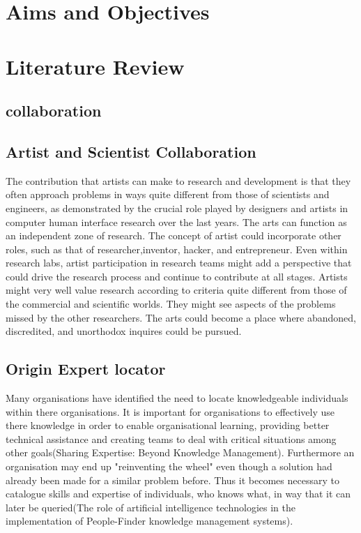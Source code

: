 \documentclass[a4paper,oneside,11pt]{report}
\begin{document}
\tableofcontents


\chapter{Aims and Objectives}
\chapter{Literature Review}
\section{collaboration}
\section{Artist and Scientist Collaboration}
The contribution that artists can make to research and development is that they often
approach problems in ways quite different from those of scientists and engineers, as
demonstrated by the crucial role played by designers and artists in computer human
interface research over the last years. The arts can function as an independent zone of
research. The concept of artist could incorporate other roles, such as that of researcher,inventor, hacker, and entrepreneur. Even within research labs, artist participation in
research teams might add a perspective that could drive the research process and continue
to contribute at all stages. Artists might very well value research according to criteria quite different from those of the commercial and scientiﬁc worlds. They might see aspects of the problems missed by the other researchers. The arts could become a place where abandoned, discredited,
and unorthodox inquires could be pursued.
\section{Origin Expert locator}
Many organisations have identified the need to locate knowledgeable individuals within there organisations. It is important for organisations to effectively use there knowledge in order to enable organisational learning, providing better technical assistance and creating teams to deal with critical situations among other goals(Sharing Expertise: Beyond Knowledge Management). Furthermore an organisation may end up "reinventing the wheel" even though a solution had already been made for a similar problem before. Thus it becomes necessary to catalogue skills and expertise of individuals, who knows what,  in way that it can later be queried(The role of artificial intelligence technologies in the implementation of People-Finder knowledge management systems). 
\end{document}
